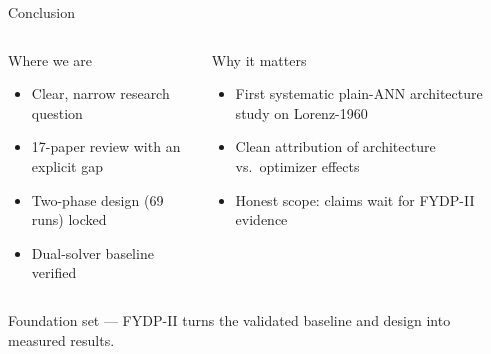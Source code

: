 \documentclass[aspectratio=169,11pt]{beamer}
\begin{document}
\begin{frame}{Conclusion}
  \begin{columns}[t]
      \begin{card}{Where we are}
        \footnotesize
        \begin{itemize}
          \item Clear, narrow research question
          \item 17-paper review with an explicit gap
          \item Two-phase design (69 runs) locked
          \item Dual-solver baseline verified
        \end{itemize}
      \end{card}
      \begin{card}{Why it matters}
        \footnotesize
        \begin{itemize}
          \item First systematic plain-ANN architecture study on Lorenz-1960
          \item Clean attribution of architecture vs.\ optimizer effects
          \item Honest scope: claims wait for FYDP-II evidence
        \end{itemize}
      \end{card}
  \end{columns}
  \vspace{0.25cm}
  \begin{plaincard}
    \centering Foundation set --- FYDP-II turns the validated baseline and design into measured results.
  \end{plaincard}
\end{frame}
\end{document}
